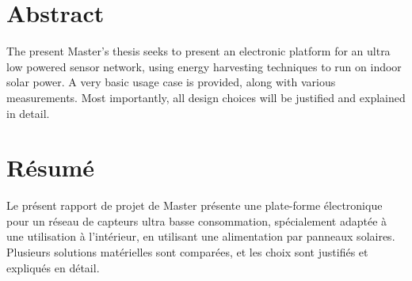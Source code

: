 \begingroup
\let\clearpage\relax
\let\cleardoublepage\relax
\let\cleardoublepage\relax

\chapter*{Abstract}
The present Master's thesis seeks to present an electronic platform for an
ultra low powered sensor network, using energy harvesting techniques to run
on indoor solar power. A very basic usage case is provided, along with
various measurements. Most importantly, all design choices will be justified
and explained in detail.


\vfill

\chapter*{Résumé}
Le présent rapport de projet de Master présente une plate-forme électronique
pour un réseau de capteurs ultra basse consommation, spécialement adaptée à 
une utilisation à l'intérieur, en utilisant une alimentation par panneaux
solaires. Plusieurs solutions matérielles sont comparées, et les choix sont
justifiés et expliqués en détail.


\endgroup			

\vfill
